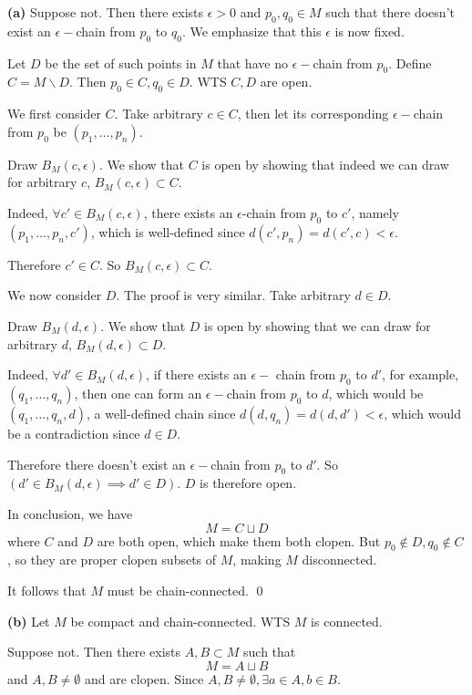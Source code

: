 \documentclass[a4paper, 12pt]{article}
\begin{document}
\begin{solution}

    \textbf{(a)} Suppose not. Then there exists $\epsilon > 0$ and $p_0, q_0 \in M$ such that there doesn't exist an $\epsilon-$chain from $p_0$ to $q_0$. We emphasize that this $\epsilon$ is now fixed.

    Let $D$ be the set of such points in $M$ that have no $\epsilon-$chain from $p_0$. Define $C = M \backslash D$. Then $p_0 \in C, q_0 \in D$. WTS $C, D$ are open.

    We first consider $C$. Take arbitrary $c \in C$, then let its corresponding $\epsilon-$chain from $p_0$ be $(p_1, \dots, p_n)$.

    Draw $B_M(c, \epsilon)$. We show that $C$ is open by showing that indeed we can draw for arbitrary $c$, $B_M(c, \epsilon) \subset C$.

    Indeed, $\forall c' \in B_M(c, \epsilon)$, there exists an $\epsilon$-chain from $p_0$ to $c'$, namely $(p_1, \dots, p_n, c')$, which is well-defined since $d(c', p_n) = d(c', c) < \epsilon$.

    Therefore $c' \in C$. So $B_M(c, \epsilon) \subset C$.

    We now consider $D$. The proof is very similar. Take arbitrary $d \in D$.

    Draw $B_M(d, \epsilon)$. We show that $D$ is open by showing that we can draw for arbitrary $d$, $B_M(d, \epsilon) \subset D$.

    Indeed, $\forall d' \in B_M(d, \epsilon)$, if there exists an $\epsilon-$ chain from $p_0$ to $d'$, for example, $(q_1, \dots, q_n)$, then one can form an $\epsilon-$chain from $p_0$ to $d$, which would be $(q_1, \dots, q_n, d)$, a well-defined chain since $d(d, q_n) = d(d, d') < \epsilon$, which would be a contradiction since $d \in D$.

    Therefore there doesn't exist an $\epsilon-$chain from $p_0$ to $d'$. So $(d' \in B_M(d, \epsilon) \implies d' \in D)$. $D$ is therefore open.

    In conclusion, we have \[
        M = C \sqcup D
    \]
    where $C$ and $D$ are both open, which make them both clopen. But $p_0 \not \in D, q_0 \not \in C$, so they are proper clopen subsets of $M$, making $M$ disconnected. \contra

    It follows that $M$ must be chain-connected. \qed

    \textbf{(b)} Let $M$ be compact and chain-connected. WTS $M$ is connected.

    Suppose not. Then there exists $A, B \subset M$ such that \[
        M = A \sqcup B
    \]
    and $A, B \neq \emptyset$ and are clopen. Since $A, B \neq \emptyset, \exists a \in A, b \in B$.


\end{solution}
\end{document}
